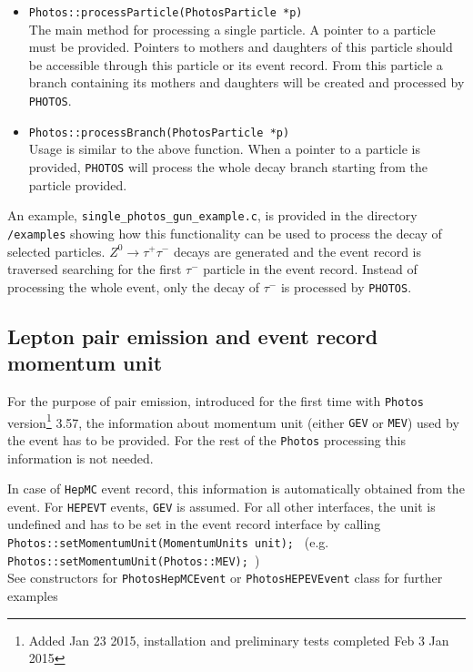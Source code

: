 \documentclass[]{Photos_interface_design}
\begin{document}
\begin{itemize}
  \item {\tt Photos::processParticle(PhotosParticle *p) } \hfill \\
		The main method for processing a single particle. A pointer to a particle must
		be provided. Pointers to mothers and daughters of this particle should be
		accessible through this particle or its event record.
		From this particle a branch containing its mothers and daughters
		will be created and processed by {\tt PHOTOS}.
  \item {\tt Photos::processBranch(PhotosParticle *p) } \hfill \\
		Usage is similar to the above function. When a pointer to a particle is provided,
		{\tt PHOTOS} will process the whole decay branch starting from the particle provided.
\end{itemize}

An example, {\tt single\_photos\_gun\_example.c}, is provided in the directory {\tt /examples}
showing how this functionality can be used to process the decay of selected particles.
$Z^0 \rightarrow \tau^+ \tau^-$ decays are generated and the event record is traversed
searching for the first $\tau^-$ particle in the event record.
Instead of processing the whole event, only the decay of $\tau^-$ is processed by {\tt PHOTOS}.

\subsection{Lepton pair emission and event record momentum unit}
\label{sec:units}



For the purpose of pair emission, introduced for the first time   with {\tt Photos} version\footnote{Added Jan 23 2015, installation and preliminary tests completed Feb 3 Jan 2015} 3.57, the information about momentum unit
(either {\tt GEV} or {\tt MEV}) used by the event has to be provided.
For the rest of the {\tt Photos} processing this information is not needed.

In case of {\tt HepMC} event record, this information is automatically obtained
from the event. For {\tt HEPEVT} events, {\tt GEV} is assumed. For all other
interfaces, the unit is undefined and has to be set in the event record
interface by calling \\ {\tt Photos::setMomentumUnit(MomentumUnits unit); }
(e.g. {\tt Photos::setMomentumUnit(Photos::MEV); })
\\ See
constructors for {\tt PhotosHepMCEvent} or {\tt PhotosHEPEVEvent} class for
further examples
\end{document}
